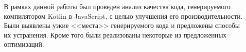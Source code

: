 \startconclusionpage


В рамках данной работы был проведен анализ качества кода, генерируемого компилятором Kotlin в JavaScript, с целью улучшения его производительности. Были выявлены узкие <<места>> генерируемого кода и предложены способы их устранения. Кроме того были реализованы некоторые из предложенных оптимизаций.
